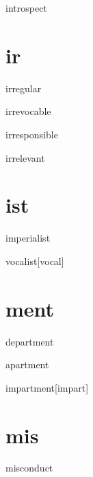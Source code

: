 \begin{RefWord}{introspect}
\end{RefWord}

\section{ir} 

\begin{RefWord}{irregular}
\end{RefWord}

\begin{RefWord}{irrevocable}
\end{RefWord}

\begin{RefWord}{irresponsible}
\end{RefWord}

\begin{RefWord}{irrelevant}
\end{RefWord}

\section{ist}

\begin{RefWord}{imperialist}
\end{RefWord}

\begin{RefWord}{vocalist}[vocal]
\end{RefWord}

\section{ment}

\begin{RefWord}{department}
\end{RefWord}

\begin{RefWord}{apartment}
\end{RefWord}

\begin{RefWord}{impartment}[impart]
\end{RefWord}

\section{mis}

\begin{RefWord}{misconduct}
\end{RefWord}

